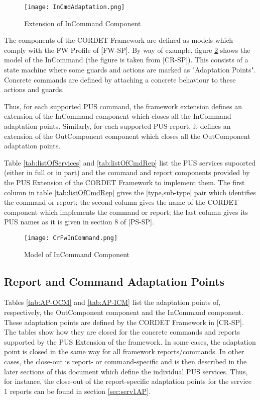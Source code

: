 \documentclass{pnp_article}
\begin{document}
\begin{figure}[H]
 \centering
 \texttt{[image: InCmdAdaptation.png]}
 \caption{Extension of InCommand Component}
 \label{fig:InCmdAdaptation}
\end{figure}

The components of the CORDET Framework are defined as models which comply with the FW Profile of [FW-SP]. By way of example, figure \ref{fig:CrFwInCommand} shows the model of the InCommand (the figure is taken from [CR-SP]). This consists of a state machine where some guards and actions are marked as "Adaptation Points". Concrete commands are defined by attaching a concrete behaviour to these actions and guards.

Thus, for each supported PUS command, the framework extension defines an extension of the InCommand component which closes all the InCommand adaptation points. Similarly, for each supported PUS report, it defines an extension of the OutComponent component which closes all the OutComponent adaptation points.

Table \ref{tab:listOfServices} and \ref{tab:listOfCmdRep} list the PUS services supoorted (either in full or in part) and the command and report components provided by the PUS Extension of the CORDET Framework to implement them. The first column in table \ref{tab:listOfCmdRep} gives the [type,sub-type] pair which identifies the command or report; the second column gives the name of the CORDET component which implements the command or report; the last column gives its PUS names as it is given in section 8 of [PS-SP]. 

\begin{figure}[H]
 \centering
 \texttt{[image: CrFwInCommand.png]}
 \caption{Model of InCommand Component}
 \label{fig:CrFwInCommand}
\end{figure}


\subsection{Report and Command Adaptation Points}\label{sec:repCmdAP}
Tables \ref{tab:AP-OCM} and \ref{tab:AP-ICM} list the adaptation points of, respectively, the OutComponent component and the InCommand component. These adaptation points are defined by the CORDET Framework in [CR-SP]. The tables show how they are closed for the concrete commands and reports supported by the PUS Extension of the framework. In some cases, the adaptation point is closed in the same way for all framework reports/commands. In other cases, the close-out is report- or command-specific and is then described in the later sections of this document which define the individual PUS services. Thus, for instance, the close-out of the report-specific adaptation points for the service 1 reports can be found in section \ref{sec:serv1AP}. 
\end{document}
